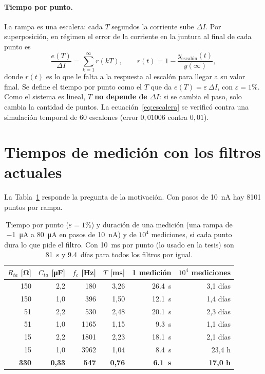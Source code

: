 \documentclass[11pt,a4paper]{article}
\begin{document}
\paragraph{Tiempo por punto.} La rampa es una escalera: cada $T$ segundos la corriente sube
$\Delta I$. Por superposición, en régimen el error de la corriente en la juntura al final de cada
punto es
\begin{equation}
  \frac{e(T)}{\Delta I} = \sum_{k=1}^{\infty} r(kT), \qquad
  r(t) = 1 - \frac{y_{\text{escalón}}(t)}{y(\infty)} ,
  \label{eq:escalera}
\end{equation}
donde $r(t)$ es lo que le falta a la respuesta al escalón para llegar a su valor final. Se define
el tiempo por punto como el $T$ que da $e(T) = \varepsilon\,\Delta I$, con $\varepsilon = 1\%$.
Como el sistema es lineal, \textbf{$T$ no depende de $\Delta I$}: si se cambia el paso, solo cambia
la cantidad de puntos. La ecuación~\eqref{eq:escalera} se
verificó contra una simulación temporal de 60 escalones (error $0{,}01006$ contra $0{,}01$).

\section{Tiempos de medición con los filtros actuales}

La Tabla~\ref{tab:fran} responde la pregunta de la motivación. Con pasos de \SI{10}{\nano\ampere}
hay \num{8101} puntos por rampa.

\begin{table}[h]
\centering
\caption{Tiempo por punto ($\varepsilon = 1\%$) y duración de una medición (una rampa de
\SI{-1}{\micro\ampere} a \SI{80}{\micro\ampere} en pasos de \SI{10}{\nano\ampere}) y de $10^4$
mediciones, si cada punto dura lo que pide el filtro. Con \SI{10}{\milli\second} por punto (lo
usado en la tesis) son \SI{81}{\second} y \SI{9.4}{días} para todos los filtros por igual.}
\label{tab:fran}
\begin{tabular}{rrrrrr}
\toprule
$R_{ta}$ [\si{\ohm}] & $C_{ta}$ [\si{\micro\farad}] & $f_c$ [\si{\hertz}] &
$T$ [\si{\milli\second}] & 1 medición & $10^4$ mediciones \\
\midrule
150 & 2,2 &  180 & 3,26 & \SI{26.4}{\second} & 3,1 días \\
150 & 1,0 &  396 & 1,50 & \SI{12.1}{\second} & 1,4 días \\
 51 & 2,2 &  530 & 2,48 & \SI{20.1}{\second} & 2,3 días \\
 51 & 1,0 & 1165 & 1,15 & \SI{9.3}{\second} & 1,1 días \\
 15 & 2,2 & 1801 & 2,23 & \SI{18.1}{\second} & 2,1 días \\
 15 & 1,0 & 3962 & 1,04 & \SI{8.4}{\second} & 23,4 h \\
\midrule
\textbf{330} & \textbf{0,33} & \textbf{547} & \textbf{0,76} & \textbf{\SI{6.1}{\second}} & \textbf{17,0 h} \\
\bottomrule
\end{tabular}
\end{table}
\end{document}
